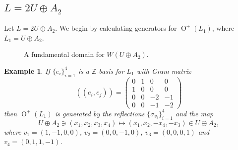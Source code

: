 \documentclass[12pt, a4paper]{article}
\newtheorem{example}[theorem]{Example}
\newcommand{\ZZ}{\mathbb{Z}}
\newcommand{\beq}{\begin{equation*}}
\newcommand{\eeq}{\end{equation*}}
\newcommand{\opn}{\operatorname}
\newcommand{\op}{\oplus}
\newcommand{\bpm}{\begin{pmatrix}}
\newcommand{\epm}{\end{pmatrix}}
\begin{document}
\subsection{$L=2U \op A_2$}
Let $L=2U \op A_2$. 
We begin by calculating generators for $\opn{O}^+(L_1)$, where $L_1=U \op A_2$.
 \begin{figure}[h!]
    \centering
    \caption{A fundamental domain for $W(U \op A_2)$.}\label{U+A2diagram}
  \end{figure}
\begin{example}\label{O+(U+A2)}
  If $\{e_i\}_{i=1}^4$ is a $\ZZ$-basis for $L_1$ with Gram matrix
  \beq
  ((e_i, e_j))=
  \bpm
  0 & 1 & 0 & 0 \\
  1 & 0 & 0 & 0 \\
  0 & 0 & -2 & -1 \\
  0 & 0 & -1 & -2
  \epm
  \eeq
  then $\opn{O}^+(L_1)$ is generated by the reflections
  $\{\sigma_{v_i}\}_{i=1}^4$
  and the map
  \begin{equation}\label{diagaut}
  U \op A_2 \ni (x_1, x_2, x_3, x_4) \mapsto (x_1, x_2, -x_4, -x_3) \in U \op A_2,
  \end{equation}
  where
  $v_1 = (1,-1,0,0)$, 
  $v_2 = (0,0,-1,0)$, 
  $v_3 = (0,0,0,1)$ and 
  $v_4 = (0,1,1,-1)$.
\end{example}
\end{document}
